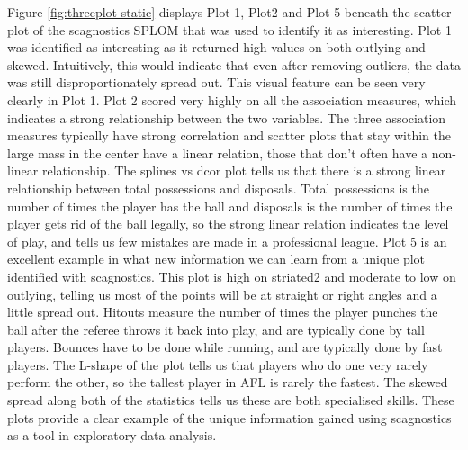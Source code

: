 Figure \ref{fig:threeplot-static} displays Plot 1, Plot2 and Plot 5
beneath the scatter plot of the scagnostics SPLOM that was used to
identify it as interesting. Plot 1 was identified as interesting as it
returned high values on both outlying and skewed. Intuitively, this
would indicate that even after removing outliers, the data was still
disproportionately spread out. This visual feature can be seen very
clearly in Plot 1. Plot 2 scored very highly on all the association
measures, which indicates a strong relationship between the two
variables. The three association measures typically have strong
correlation and scatter plots that stay within the large mass in the
center have a linear relation, those that don't often have a non-linear
relationship. The splines vs dcor plot tells us that there is a strong
linear relationship between total possessions and disposals. Total
possessions is the number of times the player has the ball and disposals
is the number of times the player gets rid of the ball legally, so the
strong linear relation indicates the level of play, and tells us few
mistakes are made in a professional league. Plot 5 is an excellent
example in what new information we can learn from a unique plot
identified with scagnostics. This plot is high on striated2 and moderate
to low on outlying, telling us most of the points will be at straight or
right angles and a little spread out. Hitouts measure the number of
times the player punches the ball after the referee throws it back into
play, and are typically done by tall players. Bounces have to be done
while running, and are typically done by fast players. The L-shape of
the plot tells us that players who do one very rarely perform the other,
so the tallest player in AFL is rarely the fastest. The skewed spread
along both of the statistics tells us these are both specialised skills.
These plots provide a clear example of the unique information gained
using scagnostics as a tool in exploratory data analysis.

